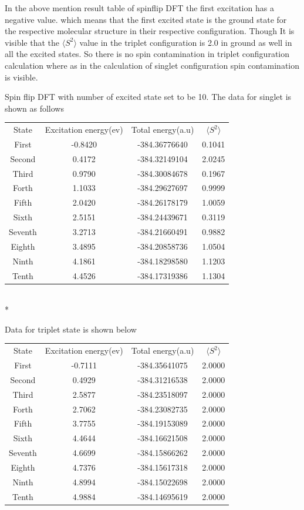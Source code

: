 \documentclass{article}
\begin{document}
In the above mention result table of spinflip DFT the first excitation has a negative value. which means that the first excited state is the ground state for the respective molecular structure in their respective configuration. Though It is visible that the \(\langle S^{2} \rangle\) value in the triplet configuration is 2.0 in ground as well in all the excited states. So there is no spin contamination in triplet configuration calculation where as in the calculation of singlet configuration spin contamination is visible.

Spin flip DFT with number of excited state set to be 10. The data for singlet is shown as follows


 \label{tab:title} 
\begin{tabular}{c c c c}
State & Excitation energy(ev) & Total energy(a.u) & \(\langle S^{2} \rangle \)\\
First & -0.8420 & -384.36776640 & 0.1041\\
Second & 0.4172& -384.32149104 &2.0245\\
Third & 0.9790& -384.30084678 &0.1967\\
Forth & 1.1033& -384.29627697 &0.9999\\
Fifth & 2.0420& -384.26178179 &1.0059\\
Sixth & 2.5151& -384.24439671 &0.3119\\
Seventh & 3.2713& -384.21660491 &0.9882\\
Eighth & 3.4895& -384.20858736 &1.0504\\
Ninth & 4.1861& -384.18298580 &1.1203\\
Tenth & 4.4526& -384.17319386 &1.1304\\
\end{tabular}\\*

Data for triplet state is shown below


 \label{tab:title} 
\begin{tabular}{c c c c}
State & Excitation energy(ev) & Total energy(a.u) & \(\langle S^{2} \rangle \)\\
First & -0.7111& -384.35641075 & 2.0000\\
Second &0.4929 & -384.31216538 & 2.0000\\
Third & 2.5877 & -384.23518097 & 2.0000\\
Forth & 2.7062 & -384.23082735 & 2.0000\\
Fifth & 3.7755& -384.19153089 & 2.0000\\
Sixth & 4.4644& -384.16621508 & 2.0000\\
Seventh & 4.6699 & -384.15866262 & 2.0000\\
Eighth &4.7376 & -384.15617318 & 2.0000\\
Ninth & 4.8994& -384.15022698 & 2.0000\\
Tenth &4.9884&-384.14695619 & 2.0000\\
\end{tabular}
\end{document}
